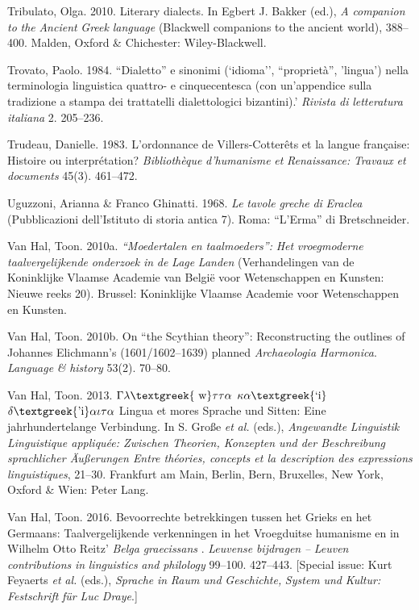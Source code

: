 \documentclass[output=paper]{langsci/langscibook}
\begin{document}
Tribulato, Olga. 2010. Literary dialects. In Egbert J. Bakker (ed.), \textit{A} \textit{companion} \textit{to} \textit{the} \textit{Ancient} \textit{Greek} \textit{language} (Blackwell companions to the ancient world), 388–400. Malden, Oxford \& Chichester: Wiley-Blackwell.

Trovato, Paolo. 1984. “Dialetto” e sinonimi (‘idioma’’, “proprietà”, ’lingua’) nella terminologia linguistica quattro- e cinquecentesca (con un’appendice sulla tradizione a stampa dei trattatelli dialettologici bizantini).’ \textit{Rivista} \textit{di} \textit{letteratura} \textit{italiana} 2. 205–236.

Trudeau, Danielle. 1983. L’ordonnance de Villers-Cotterêts et la langue française: Histoire ou interprétation? \textit{Bibliothèque} \textit{d’humanisme} \textit{et} \textit{Renaissance:} \textit{Travaux} \textit{et} \textit{documents} 45(3). 461–472.

Uguzzoni, Arianna \& Franco Ghinatti. 1968. \textit{Le} \textit{tavole} \textit{greche} \textit{di} \textit{Eraclea} (Pubblicazioni dell’Istituto di storia antica 7). Roma: “L’Erma” di Bretschneider.

Van Hal, Toon. 2010a. \textit{“Moedertalen} \textit{en} \textit{taalmoeders”:} \textit{Het} \textit{vroegmoderne} \textit{taalvergelijkende} \textit{onderzoek} \textit{in} \textit{de} \textit{Lage} \textit{Landen} (Verhandelingen van de Koninklijke Vlaamse Academie van België voor Wetenschappen en Kunsten: Nieuwe reeks 20). Brussel: Koninklijke Vlaamse Academie voor Wetenschappen en Kunsten.

Van Hal, Toon. 2010b. On “the Scythian theory”: Reconstructing the outlines of Johannes Elichmann’s (1601/1602–1639) planned \textit{Archaeologia} \textit{Harmonica}. \textit{Language} \textit{\&} \textit{history} 53(2). 70–80.

Van Hal, Toon. 2013. $\Gamma \lambda \text{\textgreek{~w}}\tau \tau \alpha $ $\kappa \alpha \text{\textgreek{`i}}$ $\delta \text{\textgreek{'i}}\alpha \iota \tau \alpha $ {\textbar} Lingua et mores {\textbar} Sprache und Sitten: Eine jahrhundertelange Verbindung. In S. Große \textit{et} \textit{al.} (eds.), \textit{Angewandte} \textit{Linguistik} \textit{{\textbar} Linguistique appliquée: Zwischen Theorien, Konzepten und der Beschreibung sprachlicher Äußerungen {\textbar} Entre théories, concepts et la description des expressions linguistiques}, 21–30. Frankfurt am Main, Berlin, Bern, Bruxelles, New York, Oxford \& Wien: Peter Lang.

Van Hal, Toon. 2016. Bevoorrechte betrekkingen tussen het Grieks en het Germaans: Taalvergelijkende verkenningen in het Vroegduitse humanisme en in Wilhelm Otto Reitz’ \textit{Belga} \textit{graecissans} . \textit{Leuvense} \textit{bijdragen} \textit{–} \textit{Leuven} \textit{contributions} \textit{in} \textit{linguistics} \textit{and} \textit{philology} 99–100. 427–443. [Special issue: Kurt Feyaerts \textit{et} \textit{al.} (eds.), \textit{Sprache} \textit{in} \textit{Raum} \textit{und} \textit{Geschichte,} \textit{System} \textit{und} \textit{Kultur:} \textit{Festschrift} \textit{für} \textit{Luc} \textit{Draye}.]
\end{document}
